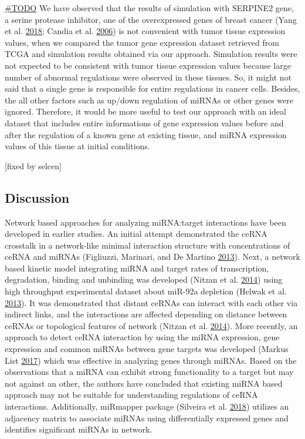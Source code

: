 \documentclass[]{article}
\begin{document}
\href{}{\#TODO} We have observed that the results of simulation with
SERPINE2 gene, a serine protease inhibitor, one of the overexpressed
genes of breast cancer (Yang et al.
\protect\hyperlink{ref-yang2018expression}{2018}; Candia et al.
\protect\hyperlink{ref-candia2006protease}{2006}) is not convenient with
tumor tissue expression values, when we compared the tumor gene
expression dataset retrieved from TCGA and simulation results obtained
via our approach. Simulation results were not expected to be consistent
with tumor tissue expression values because large number of abnormal
regulations were observed in these tissues. So, it might not said that a
single gene is responsible for entire regulations in cancer cells.
Besides, the all other factors such as up/down regulation of miRNAs or
other genes were ignored. Therefore, it would be more useful to test our
approach with an ideal dataset that includes entire informations of gene
expression values before and after the regulation of a known gene at
existing tissue, and miRNA expression values of this tissue at initial
conditions.

{[}fixed by selcen{]}

\hypertarget{discussion}{%
\subsection{Discussion}\label{discussion}}

Network based approaches for analyzing miRNA:target interactions have
been developed in earlier studies. An initial attempt demonstrated the
ceRNA crosstalk in a network-like minimal interaction structure with
concentrations of ceRNA and miRNAs (Figliuzzi, Marinari, and De Martino
\protect\hyperlink{ref-figliuzzi_micrornas_2013}{2013}). Next, a network
based kinetic model integrating miRNA and target rates of transcription,
degradation, binding and unbinding was developed (Nitzan et al.
\protect\hyperlink{ref-nitzan_interactions_2014}{2014}) using high
throughput experimental dataset about miR-92a depletion (Helwak et al.
\protect\hyperlink{ref-helwak_mapping_2013}{2013}). It was demonstrated
that distant ceRNAs can interact with each other via indirect links, and
the interactions are affected depending on distance between ceRNAs or
topological features of network (Nitzan et al.
\protect\hyperlink{ref-nitzan_interactions_2014}{2014}). More recently,
an approach to detect ceRNA interaction by using the miRNA expression,
gene expression and common miRNAs between gene targets was developed
(Markus List \protect\hyperlink{ref-markus_list_sponge_2017}{2017})
which was effective in analyzing genes through miRNAs. Based on the
observations that a miRNA can exhibit strong functionality to a target
but may not against an other, the authors have concluded that existing
miRNA based approach may not be suitable for understanding regulations
of ceRNA interactions. Additionally, miRmapper package (Silveira et al.
\protect\hyperlink{ref-da2018mirmapper}{2018}) utilizes an adjacency
matrix to associate miRNAs using differentially expressed genes and
identifies significant miRNAs in network.
\end{document}
